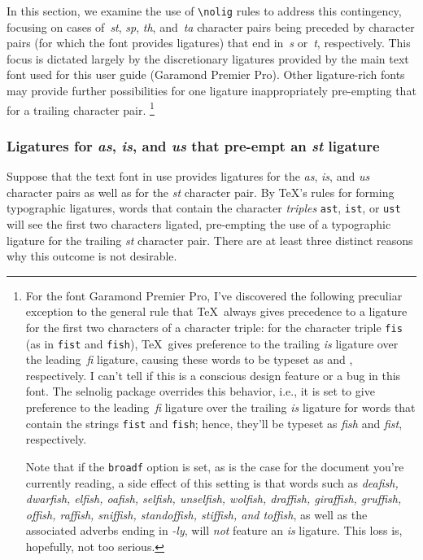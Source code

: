 \documentclass[11pt]{article}
\newcommand{\pkg}[1]{\textsf{#1}}
\newcommand{\opt}[1]{\texttt{#1}}
\newcommand{\cmmd}[1]{\texttt{\textbackslash #1}}
\begin{document}
In this section, we examine the use of \cmmd{nolig} rules to address this contingency, focusing on cases of~\emph{st}, \emph{sp}, \emph{th}, and~\emph{ta} character pairs being preceded by character pairs (for which the font provides ligatures) that end in~\emph{s} or~\emph{t}, respectively. This focus is dictated largely by the discretionary ligatures provided by the main text font used for this user guide (Garamond Premier Pro). Other ligature-rich fonts may provide further possibilities for one ligature inappropriately pre-empting that for a trailing character pair.%
\footnote{For the font Garamond Premier Pro, I've discovered the following preculiar exception to the general rule that \TeX\ always gives precedence to a ligature for the first two characters of a character triple: for the character triple \opt{fis} (as in \opt{fist} and \opt{fish}), \TeX\ gives preference to the trailing \emph{is} ligature over the leading\, \emph{fi} ligature, causing these words to be typeset as \emph{} and \emph{}, respectively. I can't tell if this is a conscious design feature or a bug in this font. The \pkg{selnolig} package overrides this behavior, i.e., it is set to give preference to the leading\, \emph{fi} ligature over the trailing \emph{is} ligature for words that contain the strings \opt{fist} and \opt{fish}; hence, they'll be typeset as \emph{fish} and \emph{fist}, respectively. 

Note that if the \opt{broadf} option is set, as is the case for the document you're currently reading, a side effect of this setting is that words such as \emph{deafish, dwarfish, elfish, oafish, selfish, unselfish, wolfish, draffish, giraffish, gruffish, offish, raffish, sniffish, standoffish, stiffish, \emph{and} toffish}, as well as the associated adverbs ending in \emph{-ly}, will \emph{not} feature an \emph{is} ligature. This loss is, hopefully, not too serious.}



\subsubsection*{Ligatures for \emph{as}, \emph{is}, and \emph{us} that pre-empt an \emph{st} ligature}

Suppose that the text font in use provides ligatures for the \emph{as}, \emph{is}, and \emph{us} character pairs as well as for the \emph{st} character pair. By \TeX's rules for forming typographic ligatures, words that contain the character \emph{triples} \opt{ast}, \opt{ist}, or \opt{ust} will see the first two characters ligated, pre-empting the use of a typographic ligature for the trailing \emph{st} character pair. There are at least three distinct reasons why this outcome is not desirable.
\end{document}
